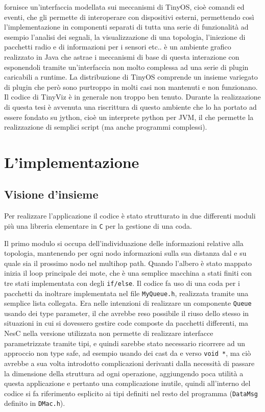 \documentclass[twoside,11pt,a4paper,italian,openany]{book}
\begin{document}
\tos fornisce un'interfaccia modellata sui meccanismi di TinyOS, cioè comandi ed eventi, 
che gli permette di interoperare con dispositivi esterni, permettendo così l'implementazione in componenti separati di tutta una serie di funzionalità ad esempio l'analisi dei segnali, la visualizzazione di una topologia, l'iniezione di pacchetti radio e di informazioni per i sensori etc.. 
\tv è un ambiente grafico realizzato in Java che astrae i meccanismi di base di questa 
interazione con \tos esponendoli tramite un'interfaccia non molto complessa ad una serie 
di plugin caricabili a runtime.  
La distribuzione di TinyOS comprende un insieme variegato di plugin che 
però sono purtroppo in molti casi non mantenuti e non funzionano. Il codice di TinyViz è 
in generale non troppo ben tenuto. 
Durante la realizzazione di questa tesi è avvenuta una riscrittura di questo ambiente che lo ha 
portato ad essere fondato su jython\cite{tython}, cioè un interprete python per JVM, 
il che permette la realizzazione di semplici script (ma anche programmi complessi).
 

\chapter{L'implementazione}
\section{Visione d'insieme}
Per realizzare l'applicazione il codice è stato strutturato in due differenti moduli più 
una libreria elementare in \texttt{C} per la gestione di una coda.

Il primo modulo si occupa dell'individuazione delle informazioni relative alla topologia, 
mantenendo per ogni nodo informazioni sulla sua distanza dal \sink e su quale sia il prossimo 
nodo nel multihop path.  
Quando l'albero è stato mappato inizia il loop principale dei mote, che è una 
semplice macchina a stati finiti con tre stati implementata con degli \texttt{if/else}.
Il codice fa uso di una coda per i pacchetti da inoltrare implementata nel file \texttt{MyQueue.h}, realizzata tramite una semplice lista collegata.
Era nelle intenzioni di realizzare un componente \texttt{Queue} usando dei type parameter, 
il che avrebbe reso possibile il riuso dello stesso in situazioni in cui si dovessero gestire 
code composte da pacchetti differenti, ma NesC nella versione utilizzata non permette di 
realizzare interfacce parametrizzate tramite tipi, e quindi sarebbe stato necessario ricorrere 
ad un approccio non type safe, ad esempio usando dei cast da e verso \texttt{void *}, ma ciò 
avrebbe a sua volta introdotto complicazioni derivanti dalla necessità di passare la dimensione 
della struttura ad ogni operazione, aggiungendo poca utilità a questa applicazione e pertanto 
una complicazione inutile, quindi all'interno del codice si fa riferimento esplicito ai tipi 
definiti nel resto del programma (\texttt{DataMsg} definito in \texttt{DMac.h}).
\end{document}
